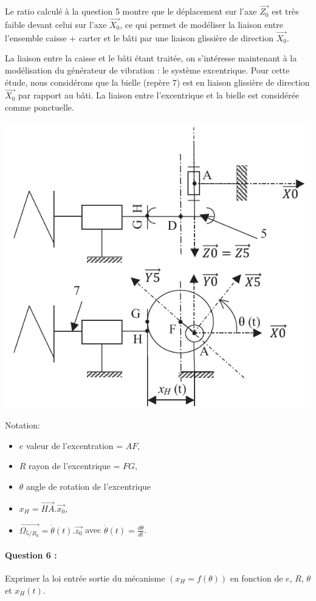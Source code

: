 Le ratio calculé à la question 5 montre que le déplacement sur l'axe $\overrightarrow{Z_0}$ est très faible devant celui sur l'axe $\overrightarrow{X_0}$, ce qui permet de modéliser la liaison entre l'ensemble caisse + carter et le bâti par une liaison glissière de direction $\overrightarrow{X_0}$.

La liaison entre la caisse et le bâti étant traitée, on s'intéresse maintenant à la modélisation du générateur de vibration : le système excentrique. Pour cette étude, nous considérons que la bielle (repère 7) est en liaison glissière de direction $\overrightarrow{X_0}$ par rapport au bâti. La liaison entre l'excentrique et la bielle est considérée comme ponctuelle.

\begin{center}
	\includegraphics[width=0.55\linewidth]{img/Decocheuse_cin2}
\end{center}

Notation:
\begin{itemize}
 \item $e$ valeur de l'excentration = $AF$,
 \item $R$ rayon de l'excentrique = $FG$,
 \item $\theta$ angle de rotation de l'excentrique
 \item $x_H=\overrightarrow{HA}.\overrightarrow{x_0}$,
 \item $\overrightarrow{\Omega_{5/R_0}}=\dot{\theta}(t).\overrightarrow{z_0}$ avec $\dot{\theta}(t)=\frac{d\theta}{dt}$.
\end{itemize} 

\paragraph{Question 6 :} Exprimer la loi entrée sortie du mécanisme $(x_H=f(\theta))$ en fonction de $e$, $R$, $\theta$ et $x_H(t)$.

